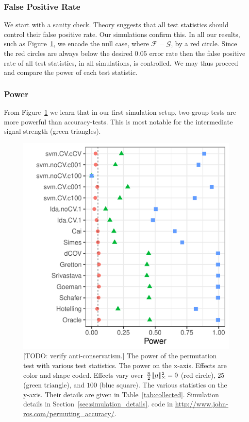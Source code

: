 \documentclass[]{bio}
\begin{document}
\subsubsection{False Positive Rate}
\label{sec:type_i}

We start with a sanity check. 
Theory suggests that all test statistics should control their false positive rate. 
Our simulations confirm this.
In all our results, such as Figure~\ref{fig:simulation_1}, we encode the null case, where $\mathcal{F}=\mathcal{G}$, by a red circle. 
Since the red circles are always below the desired $0.05$ error rate then the false positive rate of all test statistics, in all simulations, is controlled. 
We may thus proceed and compare the power of each test statistic. 






\subsubsection{Power}
\label{sec:power}

From Figure~\ref{fig:simulation_1} we learn that in our first simulation setup, two-group tests are more powerful than accuracy-tests.
This is most notable for the intermediate signal strength (green triangles). 

\begin{figure}[h]
	\centering
	\includegraphics[width=0.5\columnwidth]{"art/file2"}
	\caption{
		[TODO: verify anti-conservatism.]
		The power of the permutation test with various test statistics. 
		The power on the x-axis. 
		Effects are color and shape coded. 
		Effects vary over $\frac{n}{2}\Vert \mu \Vert^2_\Sigma=0$ (red circle), $25$ (green triangle), and $100$ (blue square). 
		The various statistics on the y-axis. 
		Their details are given in Table~\ref{tab:collected}. 
		Simulation details in Section~\ref{sec:simulation_details}.
		\R code in \url{http://www.john-ros.com/permuting_accuracy/}.}	
	\label{fig:simulation_1}
\end{figure}
\end{document}
